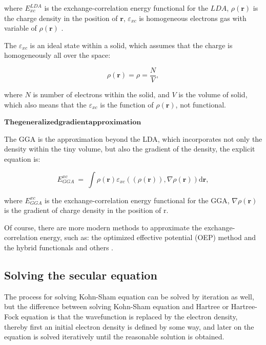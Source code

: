 \documentclass[a4paper, 12pt, titlepage,oneside,drop]{kthesis}
\begin{document}
where $ E^\textit{LDA}_\textit{xc} $ is the exchange-correlation energy functional for the $LDA$, $\rho(\textbf{r})$ is the charge density in the position of $\textbf{r}$, $\varepsilon_\textit{xc}$ is homogeneous 
electrons gas with variable of  $\rho(\textbf{r})$ .

The $\varepsilon_\textit{xc}$ is an ideal state within a solid, which assumes that the charge is homogeneously all over the space:

\begin{equation}
 \rho(\textbf{r}) = \rho = \frac{N}{V},
\end{equation}

where $N$ is number of electrons within the solid, and $V$ is the volume of solid, which also means that the $\varepsilon_\textit{xc}$ is the function of $\rho(\textbf{r})$,
 not functional. 

$\mathbf{The generalized gradient approximation}$

The GGA is the approximation beyond the LDA, which incorporates not only the density within the tiny volume, but also the gradient
 of the density, the explicit equation is:

\begin{equation}
E_{\textit{GGA}}^{\textit{xc}}\ = \ \int \rho(\textbf{r}) \varepsilon_\textit{xc}( (\rho(\textbf{r})), \nabla \rho(\textbf{r}) ) \mathrm{d} \textbf{r}, 
\end{equation}

where $E_{\textit{GGA}}^{\textit{xc}}$ is the exchange-correlation energy functional for the GGA, $\nabla \rho(\textbf{r})$ is the gradient  of charge density in the position of r.

Of course, there are more modern methods to approximate the exchange-correlation energy, such as: the optimized effective potential
(OEP) method and the hybrid functionals and others			.

\subsection{Solving the secular equation}

The process for solving Kohn-Sham equation can be solved by iteration as well, but the difference between solving Kohn-Sham 
equation and Hartree or Hartree-Fock equation is that the wavefunction is replaced by the electron density, thereby first an initial 
electron density is defined by some way, and later on the equation is solved iteratively until the reasonable solution is obtained.
\end{document}
